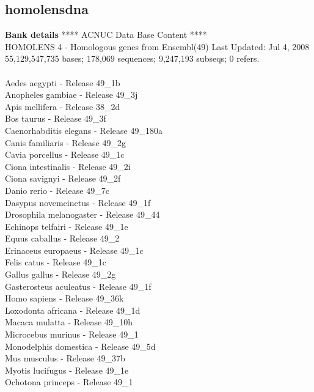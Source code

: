 \documentclass{article}
\begin{document}
\begin{Schunk}
\section{ homolensdna }
\textbf{Bank details}
             ****     ACNUC Data Base Content      ****\\
         HOMOLENS 4 - Homologous genes from Ensembl(49)	Last Updated: Jul  4, 2008\\
55,129,547,735 bases; 178,069 sequences; 9,247,193 subseqs; 0 refers.\\
\\
 Aedes aegypti - Release 49\_1b \\
 Anopheles gambiae - Release 49\_3j \\
 Apis mellifera - Release 38\_2d \\
 Bos taurus - Release 49\_3f \\
 Caenorhabditis elegans - Release 49\_180a \\
 Canis familiaris - Release 49\_2g \\
 Cavia porcellus - Release 49\_1c \\
 Ciona intestinalis - Release 49\_2i \\
 Ciona savignyi - Release 49\_2f \\
 Danio rerio - Release 49\_7c \\
 Dasypus novemcinctus - Release 49\_1f \\
 Drosophila melanogaster - Release 49\_44 \\
 Echinops telfairi - Release 49\_1e \\
 Equus caballus - Release 49\_2 \\
 Erinaceus europaeus - Release 49\_1c \\
 Felis catus - Release 49\_1c \\
 Gallus gallus - Release 49\_2g \\
 Gasterosteus aculeatus - Release 49\_1f \\
 Homo sapiens - Release 49\_36k \\
 Loxodonta africana - Release 49\_1d \\
 Macaca mulatta - Release 49\_10h \\
 Microcebus murinus - Release 49\_1 \\
 Monodelphis domestica - Release 49\_5d \\
 Mus musculus - Release 49\_37b \\
 Myotis lucifugus - Release 49\_1e \\
 Ochotona princeps - Release 49\_1 \\

\end{Schunk}
\end{document}

